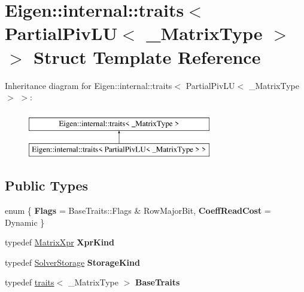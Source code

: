 \hypertarget{struct_eigen_1_1internal_1_1traits_3_01_partial_piv_l_u_3_01___matrix_type_01_4_01_4}{}\section{Eigen\+::internal\+::traits$<$ Partial\+Piv\+LU$<$ \+\_\+\+Matrix\+Type $>$ $>$ Struct Template Reference}
\label{struct_eigen_1_1internal_1_1traits_3_01_partial_piv_l_u_3_01___matrix_type_01_4_01_4}
Inheritance diagram for Eigen\+::internal\+::traits$<$ Partial\+Piv\+LU$<$ \+\_\+\+Matrix\+Type $>$ $>$\+:\begin{figure}[H]
\begin{center}
\leavevmode
\includegraphics[height=2.000000cm]{struct_eigen_1_1internal_1_1traits_3_01_partial_piv_l_u_3_01___matrix_type_01_4_01_4}
\end{center}
\end{figure}
\subsection*{Public Types}
\begin{DoxyCompactItemize}
\item 
\mbox{\label{struct_eigen_1_1internal_1_1traits_3_01_partial_piv_l_u_3_01___matrix_type_01_4_01_4_a01c7a4afd033a2a5efa357d1dff7cfb3}} 
enum \{ {\bfseries Flags} = Base\+Traits\+::Flags \& Row\+Major\+Bit, 
{\bfseries Coeff\+Read\+Cost} = Dynamic
 \}
\item 
\mbox{\label{struct_eigen_1_1internal_1_1traits_3_01_partial_piv_l_u_3_01___matrix_type_01_4_01_4_abec48b37deb2eb7ec83cc857900538ba}} 
typedef \mbox{\hyperlink{struct_eigen_1_1_matrix_xpr}{Matrix\+Xpr}} {\bfseries Xpr\+Kind}
\item 
\mbox{\label{struct_eigen_1_1internal_1_1traits_3_01_partial_piv_l_u_3_01___matrix_type_01_4_01_4_a69d58e3e3f7626479141d277d46fbf18}} 
typedef \mbox{\hyperlink{struct_eigen_1_1_solver_storage}{Solver\+Storage}} {\bfseries Storage\+Kind}
\item 
\mbox{\label{struct_eigen_1_1internal_1_1traits_3_01_partial_piv_l_u_3_01___matrix_type_01_4_01_4_ac19dabf2a52fcbe37f8fd6ba52799704}} 
typedef \mbox{\hyperlink{struct_eigen_1_1internal_1_1traits}{traits}}$<$ \+\_\+\+Matrix\+Type $>$ {\bfseries Base\+Traits}
\end{DoxyCompactItemize}


